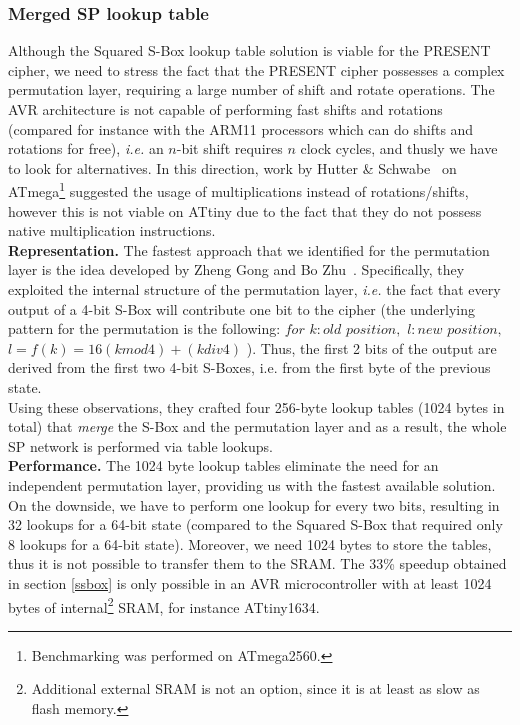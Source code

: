 \documentclass[11pt]{article}
\begin{document}
\subsubsection{Merged SP lookup table}\label{msbox}
Although the Squared S-Box lookup table solution is viable for the PRESENT cipher, we need to stress the fact that the PRESENT cipher possesses a complex permutation layer, requiring a large number of shift and rotate operations. The AVR architecture is not capable of performing fast shifts and rotations (compared for instance with the ARM11 processors which can do shifts and rotations for free),  \emph{i.e.} an $n$-bit shift requires $n$ clock cycles, and thusly we have to look for alternatives.
In this direction, work by Hutter \& Schwabe~\cite{hutternacl} on ATmega\footnote{Benchmarking was performed on ATmega2560.} suggested the usage of multiplications instead of rotations/shifts, however this is not viable on ATtiny due to the fact that they do not possess native multiplication instructions.\\
\textbf{Representation.} The fastest approach that we identified for the permutation layer is the idea developed by Zheng Gong and Bo Zhu~\cite{gong_code,gong2009towards}. Specifically, they exploited the internal structure of the permutation layer, \emph{i.e.} the fact that every output of a 4-bit S-Box will contribute one bit to the cipher (the underlying pattern for the permutation is the following: $for$ $k:old$ $position,$ $l:new$ $position,$ $l=f(k)=16(k mod 4)+(k div 4)$ ). Thus, the first 2 bits of the output are derived from the first two 4-bit S-Boxes, i.e. from the first byte of the previous state. \\
Using these observations, they crafted four 256-byte lookup tables (1024 bytes in total) that \emph{merge} the S-Box and the permutation layer and as a result, the whole SP network is performed via table lookups.\\
\textbf{Performance.} The 1024 byte lookup tables eliminate the need for an independent permutation layer, providing us with the fastest available solution. On the downside, we have to perform one lookup for every two bits, resulting in 32 lookups for a 64-bit state (compared to the Squared S-Box that required only 8 lookups for a 64-bit state). Moreover, we need 1024 bytes to store the tables, thus it is not possible to transfer them to the SRAM. The 33\% speedup obtained in section \ref{ssbox} is only possible in an AVR microcontroller with at least 1024 bytes of internal\footnote{Additional external SRAM is not an option, since it is at least as slow as flash memory.} SRAM, for instance ATtiny1634.\\
\end{document}
